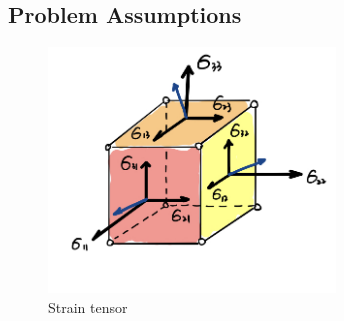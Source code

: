 \documentclass[11pt,titlepage]{article}
\begin{document}
\subsection{Problem Assumptions}


\begin{figure}[!htbp]
    \begin{center}
        \includegraphics[width=3in]{screenshots/strain_on_hex}
        \caption{Strain tensor}
    \end{center}
\end{figure}
\end{document}
